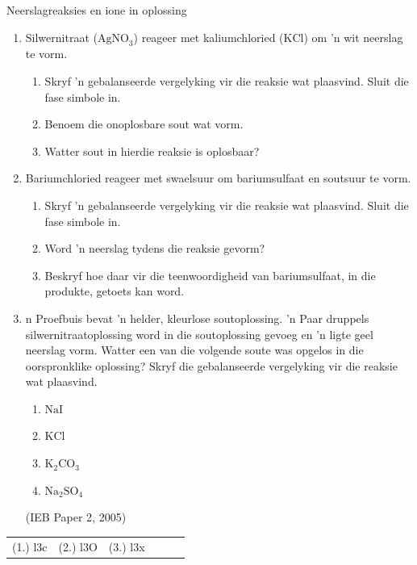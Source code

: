 {{\begin{exercises}{Neerslagreaksies en ione in oplossing}
{
\nopagebreak
\begin{enumerate}[noitemsep, label=\textbf{\arabic*}. ]
\item Silwernitraat (${\text{AgNO}}_{3}$) reageer met kaliumchloried ($\text{KCl}$) om  'n wit neerslag te vorm.
    \begin{enumerate}[noitemsep, label=\textbf{\alph*}. ] 
    \item Skryf  'n gebalanseerde vergelyking vir die reaksie wat plaasvind. Sluit die fase simbole in. 
    \item Benoem die onoplosbare sout wat vorm.
    \item Watter sout in hierdie reaksie is oplosbaar?
    \end{enumerate}
\item Bariumchloried reageer met swaelsuur om bariumsulfaat en soutsuur te vorm. 
    \begin{enumerate}[noitemsep, label=\textbf{\alph*}. ] 
    \item Skryf  'n gebalanseerde vergelyking vir die reaksie wat plaasvind. Sluit die fase simbole in.
    \item Word  'n neerslag tydens die reaksie gevorm?
    \item Beskryf hoe daar vir die teenwoordigheid van bariumsulfaat, in die produkte, getoets kan word. 
    \end{enumerate}
\item n Proefbuis bevat   'n helder, kleurlose soutoplossing.   'n Paar druppels silwernitraatoplossing word in die soutoplossing gevoeg en  'n ligte geel neerslag vorm. Watter een van die volgende soute was opgelos in die oorspronklike oplossing? Skryf die gebalanseerde 	vergelyking vir die reaksie wat plaasvind.
    \begin{enumerate}[noitemsep, label=\textbf{\alph*}. ] 
    \item $\text{NaI}$
    \item $\text{KCl}$
    \item ${\text{K}}_{2}{\text{CO}}_{3}$\label{m38719*uid86}\item ${\text{Na}}_{2}{\text{SO}}_{4}$\end{enumerate}
(IEB Paper 2, 2005)\newline
    \end{enumerate}

\practiceinfo
 \par \begin{tabular}[h]{cccccc}
 (1.) l3c  &  (2.) l3O  &  (3.) l3x  & \end{tabular}
}
\end{exercises}

}}
